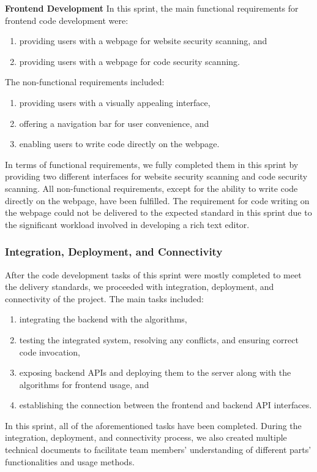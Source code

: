 \documentclass[journal]{IEEEtran}
\begin{document}
\textbf{Frontend Development}
In this sprint, the main functional requirements for frontend code development were: 
\begin{enumerate}
  \item providing users with a webpage for website security scanning, and 
  \item providing users with a webpage for code security scanning. 
\end{enumerate}
The non-functional requirements included: 
\begin{enumerate}
\item providing users with a visually appealing interface, 
\item offering a navigation bar for user convenience, and 
\item enabling users to write code directly on the webpage. 
\end{enumerate}
In terms of functional requirements, we fully completed them in this sprint by providing two different interfaces for website security scanning and code security scanning. All non-functional requirements, except for the ability to write code directly on the webpage, have been fulfilled. The requirement for code writing on the webpage could not be delivered to the expected standard in this sprint due to the significant workload involved in developing a rich text editor.

\subsubsection{Integration, Deployment, and Connectivity}
After the code development tasks of this sprint were mostly completed to meet the delivery standards, we proceeded with integration, deployment, and connectivity of the project. The main tasks included: 
\begin{enumerate}
  \item integrating the backend with the algorithms, 
  \item testing the integrated system, resolving any conflicts, and ensuring correct code invocation, 
  \item exposing backend APIs and deploying them to the server along with the algorithms for frontend usage, and 
  \item establishing the connection between the frontend and backend API interfaces.
\end{enumerate}
In this sprint, all of the aforementioned tasks have been completed. During the integration, deployment, and connectivity process, we also created multiple technical documents to facilitate team members' understanding of different parts' functionalities and usage methods.
\end{document}
